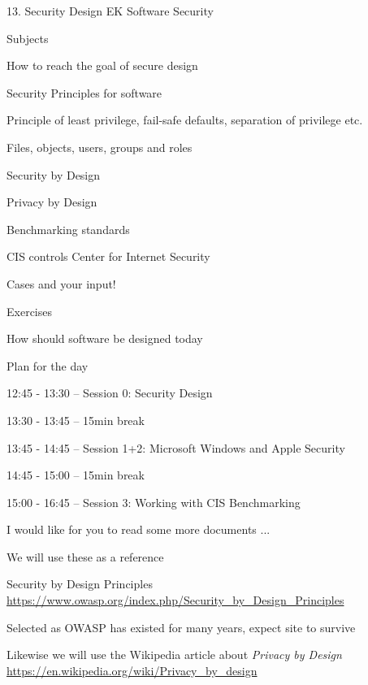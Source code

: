 \documentclass[Screen16to9,17pt]{foils}
\begin{document}
\mytitlepage
{13. Security Design}
{EK  Software Security}


\begin{list1}
\item Subjects
\begin{list2}
\item How to reach the goal of secure design
\item Security Principles for software
\item Principle of least privilege, fail-safe defaults, separation of privilege etc.
\item Files, objects, users, groups and roles
\item Security by Design
\item Privacy by Design
\item Benchmarking standards
\item CIS controls Center for Internet Security
\item Cases and your input!
\end{list2}
\item Exercises
\begin{list2}
\item How should software be designed today
\end{list2}
\end{list1}



Plan for the day
\begin{list1}
\item 12:45 - 13:30 -- Session 0: Security Design
\item 13:30 - 13:45 -- 15min break
\item 13:45 - 14:45 -- Session 1+2: Microsoft Windows and Apple Security
\item 14:45 - 15:00 -- 15min break
\item 15:00 - 16:45 -- Session 3: Working with CIS Benchmarking
\end{list1}



I would like for you to read some more documents ...


\begin{list1}
\item We will use these as a reference
\item Security by Design Principles\\
\url{https://www.owasp.org/index.php/Security_by_Design_Principles}
\item Selected as OWASP has existed for many years, expect site to survive

\item Likewise we will use the Wikipedia article about \emph{Privacy by Design}\\
\url{https://en.wikipedia.org/wiki/Privacy_by_design}
\end{list1}
\end{document}
